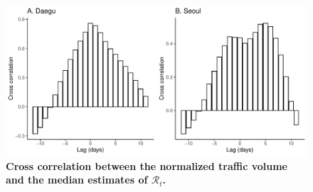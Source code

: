 \documentclass[12pt]{article}
\begin{document}
\pagebreak

\begin{figure}[!ht]
\includegraphics[width=\textwidth]{figure_cross.pdf}
\caption{
\textbf{Cross correlation between the normalized traffic volume and the median estimates of $\mathcal R_t$.}
}
\end{figure}
\end{document}
